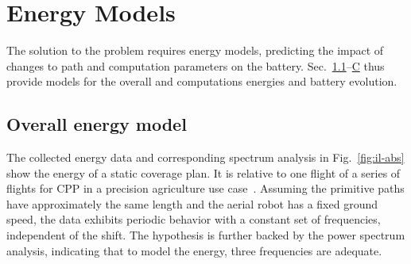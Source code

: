 \documentclass[letterpaper,10pt,conference,twoside]{IEEEtran}
\theoremstyle{definition}
\newtheorem*{pb}{Problem}%
\begin{document}


\section{Energy Models}  %
\label{sec:energy-model} %
The solution to the problem requires energy models, predicting the impact of changes to path and computation parameters on the battery. %
Sec.~\ref{sec:mod-mot}--\hyperref[sec:mod-bat]{C} {\color{black}thus} provide models for the overall and computations energies {\color{black}and }%
battery evolution.

\subsection{Overall energy model%
}
\label{sec:mod-mot}

The collected energy data and corresponding spectrum analysis in Fig.~\ref{fig:il-abs} show the energy of a static coverage plan. It is relative to one flight of a series of flights for CPP %
in a precision agriculture use case~\cite{seewald2020mechanical}. %
Assuming the primitive paths have approximately the same length and the aerial robot has a fixed ground speed, the data exhibits periodic behavior with a constant set of frequencies, independent of the shift. The hypothesis is further backed by the power spectrum analysis, indicating that to model the energy, three frequencies are adequate.

\end{document}
